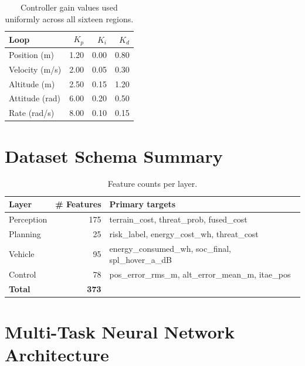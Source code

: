 \documentclass{article}
\begin{document}
\begin{table}[h]
\centering
\caption{Controller gain values used uniformly across all sixteen regions.}
\begin{tabular}{lrrr}
\toprule
Loop & $K_p$ & $K_i$ & $K_d$ \\
\midrule
Position (m)    & 1.20 & 0.00 & 0.80 \\
Velocity (m/s)  & 2.00 & 0.05 & 0.30 \\
Altitude (m)    & 2.50 & 0.15 & 1.20 \\
Attitude (rad)  & 6.00 & 0.20 & 0.50 \\
Rate (rad/s)    & 8.00 & 0.10 & 0.15 \\
\bottomrule
\end{tabular}
\end{table}

\section{Dataset Schema Summary}
\label{app:schema}

\begin{table}[h]
\centering
\caption{Feature counts per layer.}
\begin{tabular}{lrl}
\toprule
Layer & \# Features & Primary targets \\
\midrule
Perception   & 175 & terrain\_cost, threat\_prob, fused\_cost \\
Planning     &  25 & risk\_label, energy\_cost\_wh, threat\_cost \\
Vehicle      &  95 & energy\_consumed\_wh, soc\_final, spl\_hover\_a\_dB \\
Control      &  78 & pos\_error\_rms\_m, alt\_error\_mean\_m, itae\_pos \\
\midrule
\textbf{Total} & \textbf{373} & \\
\bottomrule
\end{tabular}
\end{table}

\section{Multi-Task Neural Network Architecture}
\label{app:nn_arch}
\end{document}
